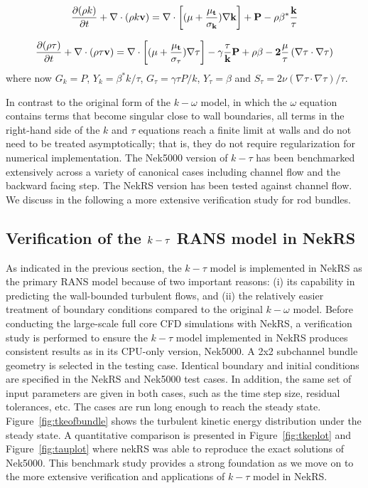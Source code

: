 \begin{equation}
    \frac{\partial (\rho k)}{\partial t} + \nabla\cdot(\rho k \bf{v}) =  \nabla\cdot\left[(\mu+\frac{\mu_t}{\sigma_k})\nabla k\right] + P-\rho \beta^{*}\frac{k}{\tau}
\end{equation}

\begin{equation}
 \frac{\partial (\rho \tau)}{\partial t} + \nabla\cdot(\rho\tau \bf{v}) =  \nabla\cdot\left[(\mu+\frac{\mu_t}{\sigma_\tau })\nabla \tau \right] - \gamma \frac{\tau}{k} P+\rho \beta-2\frac{\mu}{\tau}\left(\nabla\tau\cdot\nabla\tau\right)
\end{equation}
where now $G_k=P$, $Y_k=\beta^{*}k/\tau$, $G_\tau=\gamma\tau P/k$, $Y_\tau=\beta$ and $S_\tau=2\nu\left(\nabla\tau\cdot\nabla\tau\right)/\tau$.

In contrast to the original form of the $k-\omega$ model, in which the $\omega$ equation contains
terms that become singular close to  wall boundaries, all terms in the right-hand side of the $k$ and $\tau$ equations reach a finite  limit at walls and do not need to be treated  asymptotically; that is, they do not require regularization for numerical implementation. The Nek5000 version of  $k-\tau$ has been benchmarked extensively across a variety of canonical cases including channel flow and the backward facing step. The NekRS version has been tested against channel flow. We discuss in the following a more extensive verification study for rod bundles.

\subsection{Verification of the $\lowercase{k}-\tau$ RANS model in NekRS}
\label{sec:nrs1}
As indicated in the previous section, the $k-\tau$ model is implemented in NekRS as the primary RANS model because of two important reasons: (i) its capability in predicting the wall-bounded turbulent flows, and (ii) the relatively easier treatment of boundary conditions compared to the original $k-\omega$ model. Before conducting the large-scale full core CFD simulations with NekRS, a verification study is performed to ensure the $k-\tau$ model implemented in NekRS produces consistent results as in its CPU-only version, Nek5000. A 2x2 subchannel bundle geometry is selected in the testing case. Identical boundary and initial conditions are specified in the NekRS and Nek5000 test cases. In addition, the same set of input parameters are given in both cases, such as the time step size, residual tolerances, etc. The cases are run long enough to reach the steady state. Figure~\ref{fig:tkeofbundle} shows the turbulent kinetic energy distribution under the steady state. A quantitative comparison is presented in Figure~\ref{fig:tkeplot} and Figure~\ref{fig:tauplot} where nekRS was able to reproduce the exact solutions of Nek5000. This benchmark study provides a strong foundation as we move on to the more extensive verification and applications of $k-\tau$ model in NekRS.

